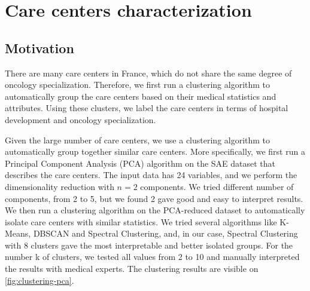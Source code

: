 \chapter{Care centers characterization}

\section{Motivation}

There are many care centers in France, which do not share the same degree of oncology specialization. Therefore, we first run a clustering algorithm to automatically group the care centers based on their medical statistics and attributes. Using these clusters, we label the care centers in terms of hospital development and oncology specialization.

Given the large number of care centers, we use a clustering algorithm to automatically group together similar care centers. More specifically, we first run a Principal Component Analysis (PCA) algorithm on the SAE dataset that describes the care centers. The input data has 24 variables, and we perform the dimensionality reduction with $n=2$ components. We tried different number of components, from 2 to 5, but we found 2 gave good and easy to interpret results. We then run a clustering algorithm on the PCA-reduced dataset to automatically isolate care centers with similar statistics. We tried several algorithms like K-Means, DBSCAN and Spectral Clustering, and, in our case, Spectral Clustering \cite{luxburg_tutorial_2007} with 8 clusters gave the most interpretable and better isolated groups. For the number k of clusters, we tested all values from 2 to 10 and manually interpreted the results with medical experts. The clustering results are visible on \cref{fig:clustering-pca}.

